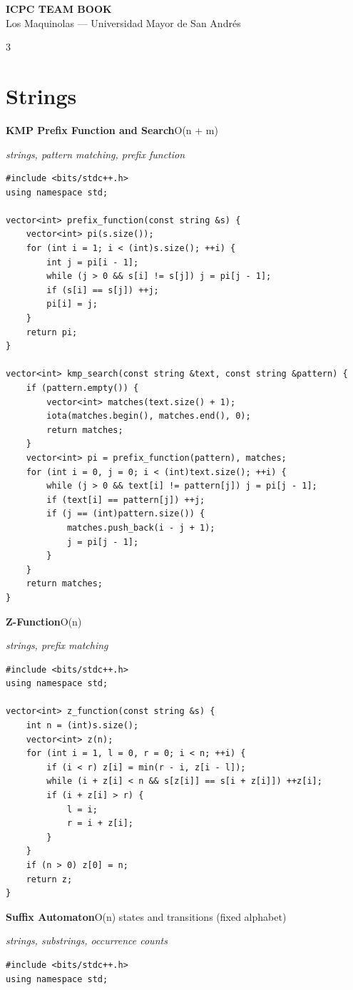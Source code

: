 \documentclass[8pt,a4paper,landscape]{article}
\begin{document}
\begin{center}
{\Large\bfseries ICPC TEAM BOOK}\\[-1pt]
{\small Los Maquinolas --- Universidad Mayor de San Andrés}
\end{center}
\vspace{-3pt}
\begin{multicols}{3}
\section*{Strings}
\textbf{KMP Prefix Function and Search}\hfill{\scriptsize O(n + m)}\par
{\scriptsize\itshape strings, pattern matching, prefix function}\par
\begin{lstlisting}
#include <bits/stdc++.h>
using namespace std;

vector<int> prefix_function(const string &s) {
    vector<int> pi(s.size());
    for (int i = 1; i < (int)s.size(); ++i) {
        int j = pi[i - 1];
        while (j > 0 && s[i] != s[j]) j = pi[j - 1];
        if (s[i] == s[j]) ++j;
        pi[i] = j;
    }
    return pi;
}

vector<int> kmp_search(const string &text, const string &pattern) {
    if (pattern.empty()) {
        vector<int> matches(text.size() + 1);
        iota(matches.begin(), matches.end(), 0);
        return matches;
    }
    vector<int> pi = prefix_function(pattern), matches;
    for (int i = 0, j = 0; i < (int)text.size(); ++i) {
        while (j > 0 && text[i] != pattern[j]) j = pi[j - 1];
        if (text[i] == pattern[j]) ++j;
        if (j == (int)pattern.size()) {
            matches.push_back(i - j + 1);
            j = pi[j - 1];
        }
    }
    return matches;
}
\end{lstlisting}
\vspace{1pt}
\textbf{Z-Function}\hfill{\scriptsize O(n)}\par
{\scriptsize\itshape strings, prefix matching}\par
\begin{lstlisting}
#include <bits/stdc++.h>
using namespace std;

vector<int> z_function(const string &s) {
    int n = (int)s.size();
    vector<int> z(n);
    for (int i = 1, l = 0, r = 0; i < n; ++i) {
        if (i < r) z[i] = min(r - i, z[i - l]);
        while (i + z[i] < n && s[z[i]] == s[i + z[i]]) ++z[i];
        if (i + z[i] > r) {
            l = i;
            r = i + z[i];
        }
    }
    if (n > 0) z[0] = n;
    return z;
}
\end{lstlisting}
\vspace{1pt}
\textbf{Suffix Automaton}\hfill{\scriptsize O(n) states and transitions (fixed alphabet)}\par
{\scriptsize\itshape strings, substrings, occurrence counts}\par
\begin{lstlisting}
#include <bits/stdc++.h>
using namespace std;


\end{lstlisting}
\end{multicols}
\end{document}
